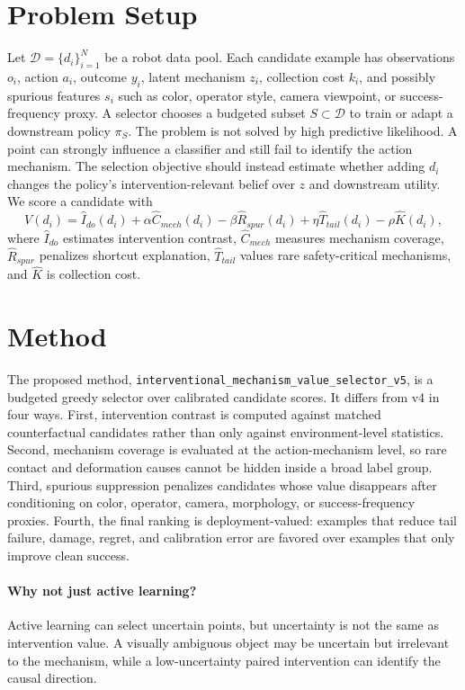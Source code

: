 \documentclass{article}
\begin{document}
\section{Problem Setup}
Let $\mathcal{D}=\{d_i\}_{i=1}^N$ be a robot data pool. Each candidate example has observations $o_i$, action $a_i$, outcome $y_i$, latent mechanism $z_i$, collection cost $k_i$, and possibly spurious features $s_i$ such as color, operator style, camera viewpoint, or success-frequency proxy. A selector chooses a budgeted subset $S\subset \mathcal{D}$ to train or adapt a downstream policy $\pi_S$.
The problem is not solved by high predictive likelihood. A point can strongly influence a classifier and still fail to identify the action mechanism. The selection objective should instead estimate whether adding $d_i$ changes the policy's intervention-relevant belief over $z$ and downstream utility.
We score a candidate with
\[
V(d_i)=\widehat{I}_{do}(d_i)+\alpha \widehat{C}_{mech}(d_i)-\beta \widehat{R}_{spur}(d_i)+\eta \widehat{T}_{tail}(d_i)-\rho \widehat{K}(d_i),
\]
where $\widehat{I}_{do}$ estimates intervention contrast, $\widehat{C}_{mech}$ measures mechanism coverage, $\widehat{R}_{spur}$ penalizes shortcut explanation, $\widehat{T}_{tail}$ values rare safety-critical mechanisms, and $\widehat{K}$ is collection cost.
\section{Method}
The proposed method, \texttt{interventional\_mechanism\_value\_selector\_v5}, is a budgeted greedy selector over calibrated candidate scores. It differs from v4 in four ways. First, intervention contrast is computed against matched counterfactual candidates rather than only against environment-level statistics. Second, mechanism coverage is evaluated at the action-mechanism level, so rare contact and deformation causes cannot be hidden inside a broad label group. Third, spurious suppression penalizes candidates whose value disappears after conditioning on color, operator, camera, morphology, or success-frequency proxies. Fourth, the final ranking is deployment-valued: examples that reduce tail failure, damage, regret, and calibration error are favored over examples that only improve clean success.
\paragraph{Why not just active learning?} Active learning can select uncertain points, but uncertainty is not the same as intervention value. A visually ambiguous object may be uncertain but irrelevant to the mechanism, while a low-uncertainty paired intervention can identify the causal direction.
\end{document}
